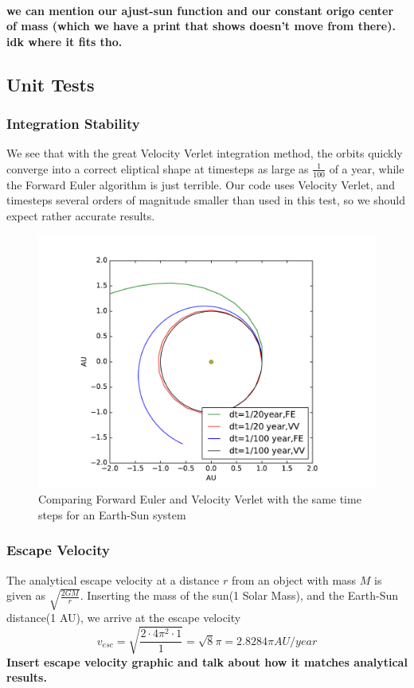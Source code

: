 \documentclass[a4paper]{article}
\begin{document}
\\
\textbf{we can mention our ajust-sun function and our constant origo center of mass (which we have a print that shows doesn't move from there). idk where it fits tho.}
\\
\subsection{Unit Tests}
\subsubsection{Integration Stability}
We see that with the great Velocity Verlet integration method, the orbits quickly converge into a correct eliptical shape at timesteps as large as $\frac{1}{100}$ of a year, while the Forward Euler algorithm is just terrible. Our code uses Velocity Verlet, and timesteps several orders of magnitude smaller than used in this test, so we should expect rather accurate results.\\


\begin{figure}[ht]
\includegraphics[width=\textwidth]{fig/timestep_test.pdf}
\caption{Comparing Forward Euler and Velocity Verlet with the same time steps for an Earth-Sun system}
\label{fig:timestep_test}
\end{figure}


\subsubsection{Escape Velocity}
The analytical escape velocity at a distance $r$ from an object with mass $M$ is given as $\sqrt{\frac{2GM}{r}}$. Inserting the mass of the sun(1 Solar Mass), and the Earth-Sun distance(1 AU), we arrive at the escape velocity
\begin{equation}
v_{esc} = \sqrt{\frac{2\cdot 4\pi^2 \cdot 1}{1}} = \sqrt{8}\pi = 2.8284\pi AU/year
\end{equation}
\textbf{Insert escape velocity graphic and talk about how it matches analytical results.}
\end{document}
